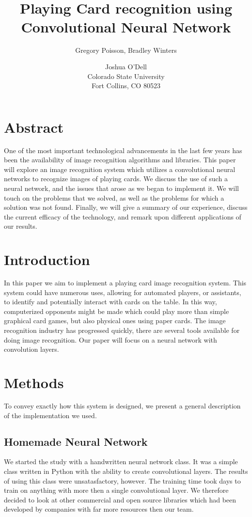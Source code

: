\documentclass[letterpaper]{article}
\title{Playing Card recognition using Convolutional Neural Network}
\author{Gregory Poisson, Bradley Winters \and Joshua O'Dell \\ Colorado State University \\ Fort Collins, CO 80523 }
\begin{document}
\maketitle

\section{Abstract}

One of the most important technological advancements in the last few years has been the availability of image recognition algorithms and libraries.  This paper will explore an image recognition system which utilizes a convolutional neural networks to recognize images of playing cards. We discuss the use of such a neural network, and the issues that arose as we began to implement it.  We will touch on the problems that we solved, as well as the problems for which a solution was not found.  Finally, we will give a summary of our experience, discuss the current efficacy of the technology, and remark upon different applications of our results.

\section{Introduction}

In this paper we aim to implement a playing card image recognition system.  This system could have numerous uses, allowing for automated players, or assistants, to identify and potentially interact with cards on the table. In this way, computerized opponents might be made which could play more than simple graphical card games, but also physical ones using paper cards.
The image recognition industry has progressed quickly, there are several tools available for doing image recognition.  Our paper will focus on a neural network with convolution layers.

\section{Methods}
To convey exactly how this system is designed, we present a general description of the implementation we used.

\subsection{Homemade Neural Network}
We started the study with a handwritten neural network class.  It was a simple class written in Python with the ability to create convolutional layers.  The results of using this class were unsatasfactory, however.  The training time took days to train on anything with more then a single convolutional layer.  We therefore decided to look at other commercial and open source libraries which had been developed by companies with far more resources then our team.
\end{document}

